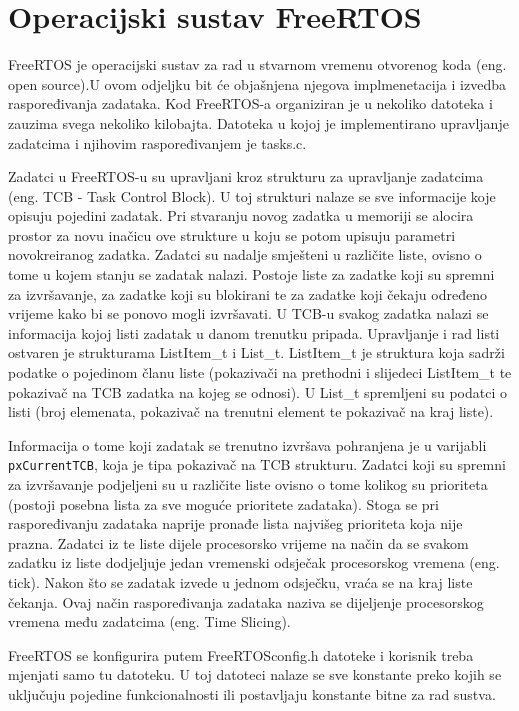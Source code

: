 \documentclass[../zavrsni.tex]{subfiles}
\begin{document}
\section{Operacijski sustav FreeRTOS}

FreeRTOS je operacijski sustav za rad u stvarnom vremenu otvorenog koda (eng. open source).U ovom odjeljku bit će objašnjena 
njegova implmenetacija i izvedba raspoređivanja zadataka. Kod FreeRTOS-a organiziran je u nekoliko datoteka i zauzima 
svega nekoliko kilobajta. Datoteka u kojoj je implementirano upravljanje zadatcima i njihovim raspoređivanjem je tasks.c.

Zadatci u FreeRTOS-u su upravljani kroz strukturu za upravljanje zadatcima (eng. TCB - Task Control Block). U toj strukturi nalaze
se sve informacije koje opisuju pojedini zadatak. Pri stvaranju novog zadatka u memoriji se alocira prostor za novu inačicu 
ove strukture u koju se potom upisuju parametri novokreiranog zadatka.
Zadatci su nadalje smješteni u različite liste, ovisno o tome u kojem stanju se zadatak nalazi. Postoje liste za zadatke koji su
spremni za izvršavanje, za zadatke koji su blokirani te za zadatke koji čekaju određeno vrijeme kako bi se ponovo mogli izvršavati.
U TCB-u svakog zadatka nalazi se informacija kojoj listi zadatak u danom trenutku pripada. Upravljanje i rad listi ostvaren je strukturama
ListItem\_t i List\_t. ListItem\_t je struktura koja sadrži podatke o pojedinom članu liste (pokazivači na prethodni i slijedeci ListItem\_t te 
pokazivač na TCB zadatka na kojeg se odnosi). U List\_t spremljeni su podatci o listi (broj elemenata, pokazivač na trenutni element te
pokazivač na kraj liste).

Informacija o tome koji zadatak se trenutno izvršava pohranjena je u varijabli \texttt{pxCurrentTCB}, koja je tipa pokazivač na TCB
strukturu.
Zadatci koji su spremni za izvršavanje podjeljeni su u različite liste ovisno o tome kolikog su prioriteta (postoji posebna lista
 za sve moguće prioritete zadataka).
Stoga se pri raspoređivanju zadataka naprije pronađe lista najvišeg prioriteta koja nije prazna. Zadatci iz te liste dijele 
procesorsko vrijeme na način da se svakom zadatku iz liste dodjeljuje jedan vremenski odsječak procesorskog vremena (eng. tick).
Nakon što se zadatak izvede u jednom odsječku, vraća se na kraj liste čekanja. Ovaj način raspoređivanja zadataka naziva se dijeljenje
procesorskog vremena među zadatcima (eng. Time Slicing).

FreeRTOS se konfigurira putem FreeRTOSconfig.h datoteke i korisnik treba mjenjati samo tu datoteku. U toj datoteci nalaze se 
sve konstante preko kojih se uključuju pojedine funkcionalnosti ili postavljaju konstante bitne za rad sustva.  
\end{document}
